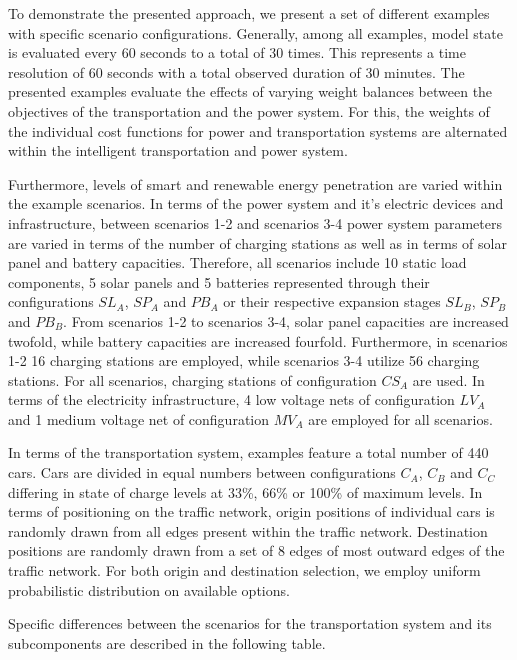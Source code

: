 To demonstrate the presented approach, we present a set of different examples with specific scenario configurations. Generally, among all examples, model state is evaluated every 60 seconds to a total of 30 times. This represents a time resolution of 60 seconds with a total observed duration of 30 minutes. The presented examples evaluate the effects of varying weight balances between the objectives of the transportation and the power system. For this, the weights of the individual cost functions for power and transportation systems are alternated within the intelligent transportation and power system.

Furthermore, levels of smart and renewable energy penetration are varied within the example scenarios. In terms of the power system and it's electric devices and infrastructure, between scenarios 1-2 and scenarios 3-4 power system parameters are varied in terms of the number of charging stations as well as in terms of solar panel and battery capacities. Therefore, all scenarios include 10 static load components, 5 solar panels and 5 batteries represented through their configurations $SL_{A}$, $SP_{A}$ and $PB_{A}$ or their respective expansion stages $SL_{B}$, $SP_{B}$ and $PB_{B}$. From scenarios 1-2 to scenarios 3-4, solar panel capacities are increased twofold, while battery capacities are increased fourfold. Furthermore, in scenarios 1-2 16 charging stations are employed, while scenarios 3-4 utilize 56 charging stations. For all scenarios, charging stations of configuration $CS_{A}$ are used. In terms of the electricity infrastructure, 4 low voltage nets of configuration $LV_{A}$ and 1 medium voltage net of configuration $MV_{A}$ are employed for all scenarios. 


In terms of the transportation system, examples feature a total number of 440 cars. Cars are divided in equal numbers between configurations $C_{A}$, $C_{B}$ and $C_{C}$ differing in state of charge levels at 33\%, 66\% or 100\% of maximum levels. In terms of positioning on the traffic network, origin positions of individual cars is randomly drawn from all edges present within the traffic network. Destination positions are randomly drawn from a set of 8 edges of most outward edges of the traffic network. For both origin and destination selection, we employ uniform probabilistic distribution on available options. 

Specific differences between the scenarios for the transportation system and its subcomponents are described in the following table. 

